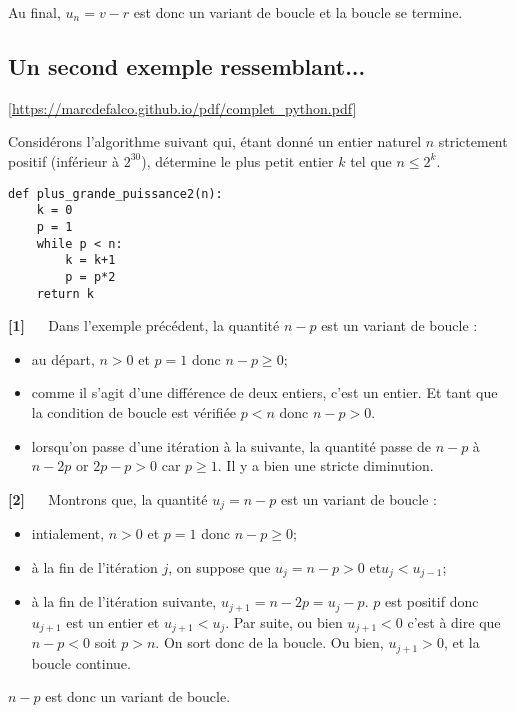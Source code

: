 Au final, $u_n = v-r$ est donc un variant de boucle et la boucle se termine.


\subsection{Un second exemple ressemblant...} 

\begin{flushright}
\footnotesize
[\url{https://marcdefalco.github.io/pdf/complet_python.pdf}]
\normalsize
\end{flushright}

Considérons l’algorithme suivant qui, étant donné un entier naturel $n$ strictement positif (inférieur à $2^{30}$), détermine le plus petit entier $k$ tel que $n \leq 2^k$.
\begin{lstlisting}
def plus_grande_puissance2(n):
    k = 0
    p = 1
    while p < n:
        k = k+1
        p = p*2
    return k
\end{lstlisting}
\begin{demo}\textbf{[1]} $\quad$
Dans l’exemple précédent, la quantité $n - p$ est un variant de boucle :
\begin{itemize}
\item au départ, $n > 0$ et $p = 1$ donc $n - p \geq 0$;
\item comme il s’agit d’une différence de deux entiers, c’est un entier. Et tant que la condition
de boucle est vérifiée $p < n$ donc $n - p > 0$.
\item lorsqu’on passe d’une itération à la suivante, la quantité passe de $n-p$ à $n-2p$ or $2p-p > 0$
car $p \geq 1$. Il y a bien une stricte diminution.
\end{itemize}
\end{demo}

\begin{demo}\textbf{[2]} $\quad$
Montrons que, la quantité $u_j = n - p$ est un variant de boucle :
\begin{itemize}
\item intialement, $n > 0$ et $p = 1$ donc $n - p \geq 0$;
\item à la fin de l'itération $j$, on suppose que $u_j = n - p >0 $ et$u_j < u_{j-1}$;
\item à la fin de l'itération suivante, $u_{j+1}=n-2p = u_j - p$. $p$ est positif donc $u_{j+1}$ est un entier et $u_{j+1}<u_j$. Par suite, ou bien $u_{j+1}<0$ c'est à dire que $n-p<0$ soit $p>n$. On sort donc de la boucle. Ou bien, $u_{j+1}>0$, et la boucle continue.
\end{itemize}
$n - p$ est donc un variant de boucle.
\end{demo}

